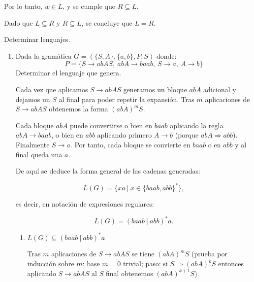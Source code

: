 \documentclass[12pt]{book} %
\begin{document}
\begin{enumerate}
\begin{solucion}[Ejercicio 1.d]
\begin{itemize}
           Por lo tanto, $w \in L$, y se cumple que $R \subseteq L$.
   \end{itemize}

   Dado que $L \subseteq R$ y $R \subseteq L$, se concluye que $L = R$.

   \end{solucion}
\end{enumerate}

\begin{ejercicio}
Determinar lenguajes.
\end{ejercicio}

\begin{enumerate}
\def\labelenumi{\alph{enumi})}
\item
  Dada la gramática \(G = (\{S, A\}, \{a, b\}, P, S)\) donde:\\
  \[P = \{S \to abAS, \ abA \to baab, \ S \to a, \ A \to b\}\]
  Determinar el lenguaje que genera.

  \begin{solucion}[Ejercicio 2.a]

       Cada vez que aplicamos $S \to abAS$ generamos un bloque $abA$ adicional y dejamos un $S$ al final para poder repetir la expansión. Tras $m$ aplicaciones de $S \to abAS$ obtenemos la forma $(abA)^mS$.

       Cada bloque $abA$ puede convertirse o bien en $baab$ aplicando la regla $abA \to baab$, o bien en $abb$ aplicando primero $A \to b$ (porque $abA \Rightarrow abb$). Finalmente $S \to a$. Por tanto, cada bloque se convierte en $baab$ o en $abb$ y al final queda una $a$.

       De aquí se deduce la forma general de las cadenas generadas:

       $$
       L(G) = \{ xa \ | \ x \in \{baab, abb\}^* \},
       $$

       es decir, en notación de expresiones regulares:

       $$
       L(G) = (baab \ | \ abb)^* a.
       $$


       \begin{enumerate}
           \item $L(G) \subseteq (baab \ | \ abb)^* a$

               Tras $m$ aplicaciones de $S \to abAS$ se tiene $(abA)^mS$ (prueba por inducción sobre $m$: base $m=0$ trivial; paso: si $S \Rightarrow (abA)^kS$ entonces aplicando $S \to abAS$ al $S$ final obtenemos $(abA)^{k+1}S$).


\end{enumerate}
\end{solucion}
\end{enumerate}
\end{document}

